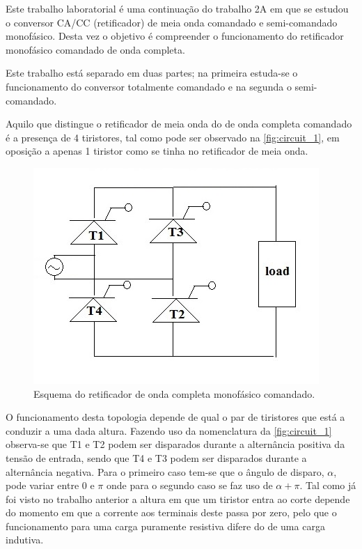 \documentclass[a4paper,11pt]{article}
\numberwithin{equation}{section}
\begin{document}
Este trabalho laboratorial é uma continuação do trabalho 2A em que se estudou o conversor CA/CC (retificador) de meia onda comandado e semi-comandado monofásico. Desta vez o objetivo é compreender o funcionamento do retificador monofásico comandado de onda completa.

Este trabalho está separado em duas partes; na primeira estuda-se o funcionamento do conversor totalmente comandado e na segunda o semi-comandado.

Aquilo que distingue o retificador de meia onda do de onda completa comandado é a presença de 4 tiristores, tal como pode ser observado na \autoref{fig:circuit_1}, em oposição a apenas 1 tiristor como se tinha no retificador de meia onda.


\begin{figure}[h]
	\centering
	\includegraphics[keepaspectratio=true, scale=0.8]{img/circuito.png}
	\caption{Esquema do retificador de onda completa monofásico comandado.}
	\label{fig:circuit_1}
	\vspace{-0.8em}
\end{figure}

O funcionamento desta topologia depende de qual o par de tiristores que está a conduzir a uma dada altura. Fazendo uso da nomenclatura da \autoref{fig:circuit_1} observa-se que T1 e T2 podem ser disparados durante a alternância positiva da tensão de entrada, sendo que T4 e T3 podem ser disparados durante a alternância negativa. Para o primeiro caso tem-se que o ângulo de disparo, $\alpha$, pode variar entre $0$ e $\pi$ onde para o segundo caso se faz uso de $\alpha + \pi$. Tal como já foi visto no trabalho anterior a altura em que um tiristor entra ao corte depende do momento em que a corrente aos terminais deste passa por zero, pelo que o funcionamento para uma carga puramente resistiva difere do de uma carga indutiva.
\end{document}
